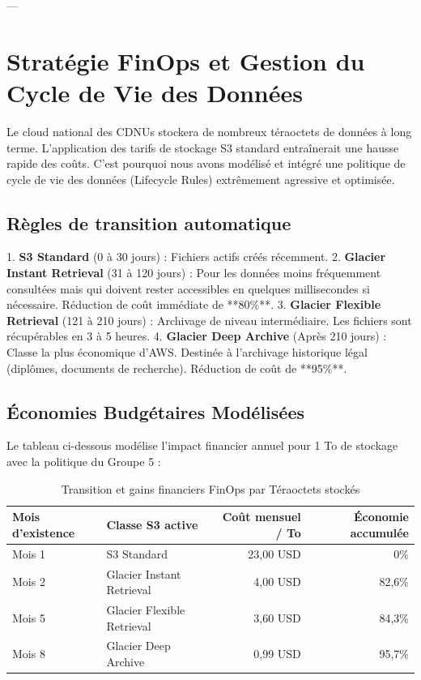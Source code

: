 \documentclass[12pt,a4paper]{article}
\begin{document}
---

\section{Stratégie FinOps et Gestion du Cycle de Vie des Données}
Le cloud national des CDNUs stockera de nombreux téraoctets de données à long terme. L'application des tarifs de stockage S3 standard entraînerait une hausse rapide des coûts. C'est pourquoi nous avons modélisé et intégré une politique de cycle de vie des données (Lifecycle Rules) extrêmement agressive et optimisée.

\subsection{Règles de transition automatique}
1. \textbf{S3 Standard} (0 à 30 jours) : Fichiers actifs créés récemment.
2. \textbf{Glacier Instant Retrieval} (31 à 120 jours) : Pour les données moins fréquemment consultées mais qui doivent rester accessibles en quelques millisecondes si nécessaire. Réduction de coût immédiate de **80\%**.
3. \textbf{Glacier Flexible Retrieval} (121 à 210 jours) : Archivage de niveau intermédiaire. Les fichiers sont récupérables en 3 à 5 heures.
4. \textbf{Glacier Deep Archive} (Après 210 jours) : Classe la plus économique d'AWS. Destinée à l'archivage historique légal (diplômes, documents de recherche). Réduction de coût de **95\%**.

\subsection{Économies Budgétaires Modélisées}
Le tableau ci-dessous modélise l'impact financier annuel pour 1 To de stockage avec la politique du Groupe 5 :

\begin{table}[h!]
    \centering
    \caption{Transition et gains financiers FinOps par Téraoctets stockés}
    \begin{tabular}{llrr}
        \toprule
        \textbf{Mois d'existence} & \textbf{Classe S3 active} & \textbf{Coût mensuel / To} & \textbf{Économie accumulée} \\
        \midrule
        Mois 1 & S3 Standard & 23,00 USD & 0\% \\
        Mois 2 & Glacier Instant Retrieval & 4,00 USD & 82,6\% \\
        Mois 5 & Glacier Flexible Retrieval & 3,60 USD & 84,3\% \\
        Mois 8 & Glacier Deep Archive & 0,99 USD & 95,7\% \\
        \bottomrule
    \end{tabular}
    \label{tab:finops_details}
\end{table}
\end{document}
